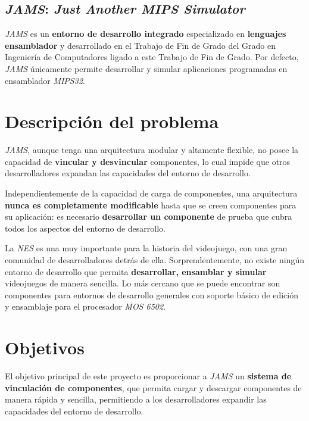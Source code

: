 \subsection{\textit{JAMS}: \textit{Just Another MIPS Simulator}}
\label{subsec:jams-just-another-mips-simulator}

\textit{JAMS} es un \textbf{entorno de desarrollo integrado} especializado
en \textbf{lenguajes ensamblador} y desarrollado en el Trabajo
de Fin de Grado del Grado en Ingeniería de Computadores ligado
a este Trabajo de Fin de Grado.
Por defecto, \textit{JAMS} únicamente permite desarrollar y simular
aplicaciones programadas en ensamblador \textit{MIPS32}.


\section{Descripción del problema}\label{sec:descripcion-del-problema}

\textit{JAMS}, aunque tenga una arquitectura modular y altamente
flexible, no posee la capacidad de \textbf{vincular y desvincular}
componentes, lo cual impide que otros desarrolladores expandan
las capacidades del entorno de desarrollo.

 Independientemente de la capacidad de carga de componentes,
una arquitectura \textbf{nunca es completamente modificable} hasta que
se creen componentes para su aplicación: es necesario
\textbf{desarrollar un componente} de prueba que cubra
todos los aspectos del entorno de desarrollo.

 La \textit{NES} es una muy importante para la historia
del videojuego, con una gran comunidad de desarrolladores detrás
de ella.
Sorprendentemente, no existe ningún entorno de desarrollo que permita
\textbf{desarrollar, ensamblar y simular} videojuegos de manera sencilla.
Lo más cercano que se puede encontrar son componentes
para entornos de desarrollo generales con soporte básico de edición y
ensamblaje para el procesador \textit{MOS 6502}.


\section{Objetivos}\label{sec:objetivos}

El objetivo principal de este proyecto es proporcionar a \textit{JAMS}
un \textbf{sistema de vinculación de componentes}, que permita cargar
y descargar componentes de manera rápida y sencilla, permitiendo
a los desarrolladores expandir las capacidades del entorno de desarrollo.

